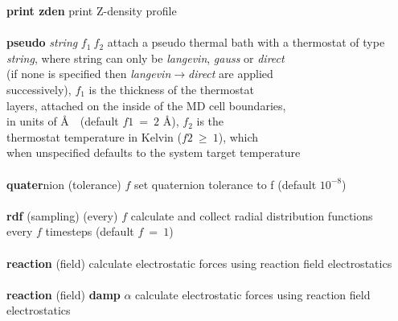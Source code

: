 \begin{tabbing}
\> {\bf print zden}                             \> print Z-density profile \\
\>                                              \> \\
\> {\bf pseudo} {\em string} $f_{1}~f_{2}$      \> attach a pseudo thermal bath with a thermostat of type \\
\>                                              \> {\em string}, where string can only be {\em langevin}, {\em gauss} or {\em direct} \\
\>                                              \> (if none is specified then {\em langevin$\rightarrow$direct} are applied \\
\>                                              \> successively), $f_{1}$ is the thickness of the thermostat \\
\>                                              \> layers, attached on the inside of the MD cell boundaries, \\
\>                                              \> in units of \AA~~(default $f{1}~=~2$ \AA), $f_{2}$ is the \\
\>                                              \> thermostat temperature in Kelvin ($f{2}~\ge~1$), which \\
\>                                              \> when unspecified defaults to the system target temperature \\
\>                                              \> \\
\> {\bf quater}nion (tolerance) $f$             \> set quaternion tolerance to f (default $10^{-8}$) \\
\>                                              \> \\
\> {\bf rdf} (sampling) (every) $f$             \> calculate and collect radial distribution functions \\
\>                                              \> every $f$ timesteps (default $f~=~1$) \\
\>                                              \> \\
\> {\bf reaction} (field)                       \> calculate electrostatic forces using reaction field electrostatics \\
\>                                              \> \\
\> {\bf reaction} (field) {\bf damp} $\alpha$   \> calculate electrostatic forces using reaction field electrostatics \\

\end{tabbing}
